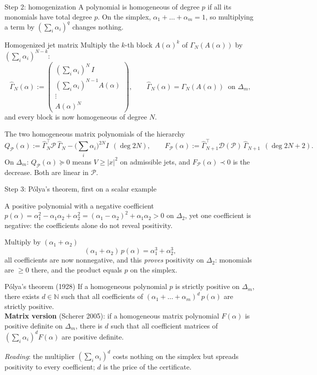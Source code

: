 \documentclass[10pt,aspectratio=169]{beamer}
\newcommand{\N}{\mathbb{N}}
\newcommand{\tr}{^{\top}}
\newcommand{\PP}{\mathcal{P}}
\newcommand{\DD}{\mathcal{D}}
\begin{document}
\begin{frame}{Step 2: homogenization}
\small A polynomial is \alert{homogeneous} of degree $p$ if all its monomials have total degree $p$. On the simplex, $\alpha_1+\dots+\alpha_m=1$, so multiplying a term by $(\sum_i\alpha_i)^q$ changes nothing.
\begin{block}{Homogenized jet matrix}
Multiply the $k$-th block $A(\alpha)^k$ of $\Gamma_N(A(\alpha))$ by $(\sum_i\alpha_i)^{N-k}$:
\[
\hat\Gamma_N(\alpha):=\begin{pmatrix}(\sum_i\alpha_i)^N\,I\\(\sum_i\alpha_i)^{N-1}A(\alpha)\\\vdots\\A(\alpha)^N\end{pmatrix},\qquad
\hat\Gamma_N(\alpha)=\Gamma_N(A(\alpha))\ \text{ on }\Delta_m ,
\]
and every block is now homogeneous of degree $N$.
\end{block}
\begin{block}{The two homogeneous matrix polynomials of the hierarchy}
\[
Q_\PP(\alpha):=\hat\Gamma_N\tr\PP\,\hat\Gamma_N-\Big(\sum_i\alpha_i\Big)^{2N}I\ \ (\deg 2N),\qquad
F_\PP(\alpha):=\hat\Gamma_{N+1}\tr\DD(\PP)\,\hat\Gamma_{N+1}\ \ (\deg 2N+2).
\]
On $\Delta_m$: $Q_\PP(\alpha)\succeq0$ means $V\ge|x|^2$ on admissible jets, and $F_\PP(\alpha)\prec0$ is the decrease. Both are linear in $\PP$.
\end{block}
\end{frame}

\begin{frame}{Step 3: P\'olya's theorem, first on a scalar example}
\small\begin{block}{A positive polynomial with a negative coefficient}
$p(\alpha)=\alpha_1^2-\alpha_1\alpha_2+\alpha_2^2=(\alpha_1-\alpha_2)^2+\alpha_1\alpha_2>0$ on $\Delta_2$, yet one coefficient is negative: the coefficients alone do not reveal positivity.
\end{block}
\begin{block}{Multiply by $(\alpha_1+\alpha_2)$}
\[
(\alpha_1+\alpha_2)\,p(\alpha)=\alpha_1^3+\alpha_2^3 ,
\]
all coefficients are now nonnegative, and this \emph{proves} positivity on $\Delta_2$: monomials are $\ge0$ there, and the product equals $p$ on the simplex.
\end{block}
\begin{block}{P\'olya's theorem (1928)}
If a homogeneous polynomial $p$ is strictly positive on $\Delta_m$, there exists $d\in\N$ such that all coefficients of $(\alpha_1+\dots+\alpha_m)^d\,p(\alpha)$ are strictly positive.\\
\textbf{Matrix version} (Scherer 2005): if a homogeneous matrix polynomial $F(\alpha)$ is positive definite on $\Delta_m$, there is $d$ such that all coefficient matrices of $(\sum_i\alpha_i)^dF(\alpha)$ are positive definite.
\end{block}
\emph{Reading}: the multiplier $(\sum_i\alpha_i)^d$ costs nothing on the simplex but spreads positivity to every coefficient; $d$ is the price of the certificate.
\end{frame}
\end{document}

